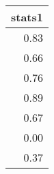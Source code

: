 \begin{table}[ht]
\centering
\begin{tabular}{r}
  \hline
stats1 \\ 
  \hline
0.83 \\ 
  0.66 \\ 
  0.76 \\ 
  0.89 \\ 
  0.67 \\ 
  0.00 \\ 
  0.37 \\ 
   \hline
\end{tabular}
\end{table}
